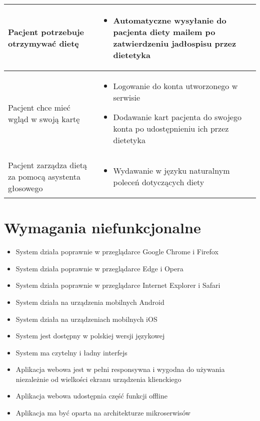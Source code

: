\begin{minipage}{\textwidth}
\begin{table}[H]
\begin{tabular}{|P{.3\textwidth}|P{.6\textwidth}|}
            \hline
            Pacjent potrzebuje otrzymywać dietę &
            \begin{itemize}
                \item Automatyczne wysyłanie do pacjenta diety mailem po zatwierdzeniu jadłospisu przez dietetyka
            \end{itemize} \\
            \hline
            Pacjent chce mieć wgląd w swoją kartę &
            \begin{itemize}
                \item Logowanie do konta utworzonego w serwisie
                \item Dodawanie kart pacjenta do swojego konta po udostępnieniu ich przez dietetyka
            \end{itemize} \\
            \hline
            Pacjent zarządza dietą za pomocą asystenta głosowego &
            \begin{itemize}
                \item Wydawanie w języku naturalnym poleceń dotyczących diety
            \end{itemize} \\
            \hline
        \end{tabular}
    \end{table}
\end{minipage}

\newpage

\section{Wymagania niefunkcjonalne}
\begin{itemize}
    \item System działa poprawnie w przeglądarce Google Chrome i Firefox
    \item System działa poprawnie w przeglądarce Edge i Opera
    \item System działa poprawnie w przeglądarce Internet Explorer i Safari
    \item System działa na urządzenia mobilnych Android
    \item System działa na urządzeniach mobilnych iOS
    \item System jest dostępny w polskiej wersji językowej
    \item System ma czytelny i ładny interfejs
    \item Aplikacja webowa jest w pełni responsywna i wygodna do używania niezależnie od wielkości ekranu urządzenia klienckiego
    \item Aplikacja webowa udostępnia część funkcji offline
    \item Aplikacja ma być oparta na architekturze mikroserwisów
\end{itemize}
\thispagestyle{normal}

